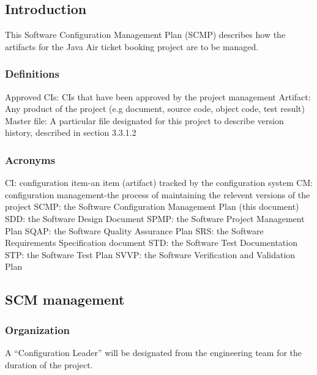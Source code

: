\documentclass{scrartcl}
\begin{document}
\setcounter{secnumdepth}{4}
\setcounter{tocdepth}{4}
\tableofcontents

\newpage
\setcounter{section}{3}
\subsection{Introduction}
This Software Configuration Management Plan (SCMP) describes how the artifacts for the Java Air ticket booking project are to be managed.
\subsubsection{Definitions}
Approved CIs: CIs that have been approved by the project management \newline
Artifact: Any product of the project (e.g document, source code, object code, test result) \newline
Master file: A particular file designated for this project to describe version history, described in section 3.3.1.2
\subsubsection{Acronyms}
CI: configuration item-an item (artifact) tracked by the configuration system \newline
CM: configuration management-the process of maintaining the relevent versions of the project \newline
SCMP: the Software Configuration Management Plan (this document)\newline
SDD: the Software Design Document \newline
SPMP: the Software Project Management Plan \newline
SQAP: the Software Quality Assurance Plan \newline
SRS: the Software Requirements Specification document \newline
STD: the Software Test Documentation \newline
STP: the Software Test Plan \newline
SVVP: the Software Verification and Validation Plan 
\subsection{SCM management}
\subsubsection{Organization}
A ``Configuration Leader'' will be designated from the engineering team for the duration of the project.
\end{document}
